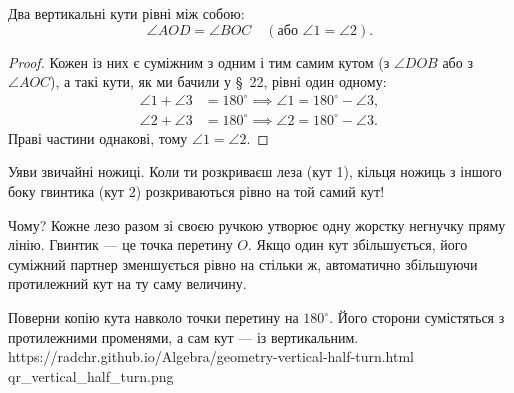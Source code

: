 \begin{theorem}
Два вертикальні кути рівні між собою:
\[
\angle AOD = \angle BOC \quad (\text{або } \angle 1 = \angle 2).
\]
\end{theorem}

\begin{proof}
Кожен із них є суміжним з одним і тим самим кутом (з $\angle DOB$ або з $\angle AOC$), а такі кути, як ми бачили у §~22, рівні один одному:
\begin{align*}
    \angle 1 + \angle 3 &= 180^\circ \implies \angle 1 = 180^\circ - \angle 3, \\
    \angle 2 + \angle 3 &= 180^\circ \implies \angle 2 = 180^\circ - \angle 3.
\end{align*}
Праві частини однакові, тому $\angle 1 = \angle 2$.
\end{proof}

\begin{feynmanbox}
Уяви звичайні ножиці. Коли ти розкриваєш леза (кут 1), кільця ножиць з іншого боку гвинтика (кут 2) розкриваються рівно на той самий кут! 

Чому? Кожне лезо разом зі своєю ручкою утворює одну жорстку негнучку пряму лінію. Гвинтик — це точка перетину $O$. Якщо один кут збільшується, його суміжний партнер зменшується рівно на стільки ж, автоматично збільшуючи протилежний кут на ту саму величину.
\end{feynmanbox}

%
{Поверни копію кута навколо точки перетину на $180^\circ$. Його сторони сумістяться з протилежними променями, а сам кут --- із вертикальним.}%
{https://radchr.github.io/Algebra/geometry-vertical-half-turn.html}%
{qr_vertical_half_turn.png}

